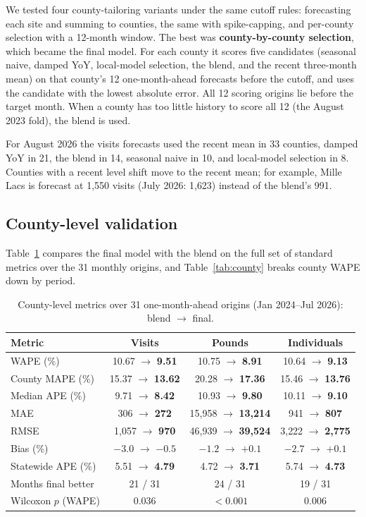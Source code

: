 \documentclass[11pt,letterpaper]{article}
\newcommand{\best}[1]{\textbf{#1}}
\begin{document}
We tested four county-tailoring variants under the same cutoff rules: forecasting each site and
summing to counties, the same with spike-capping, and per-county selection with a 12-month window. The
best was \textbf{county-by-county selection}, which became the final model. For each county it scores
five candidates (seasonal naive, damped YoY, local-model selection, the blend, and the recent
three-month mean) on that county's 12 one-month-ahead forecasts before the cutoff, and uses the
candidate with the lowest absolute error. All 12 scoring origins lie before the target month. When a
county has too little history to score all 12 (the August 2023 fold), the blend is used.

For August 2026 the visits forecasts used the recent mean in 33 counties, damped YoY in 21, the
blend in 14, seasonal naive in 10, and local-model selection in 8. Counties with a recent level
shift move to the recent mean; for example, Mille Lacs is forecast at 1{,}550 visits (July 2026:
1{,}623) instead of the blend's 991.

\subsection{County-level validation}
Table~\ref{tab:metrics} compares the final model with the blend on the full set of standard metrics
over the 31 monthly origins, and Table~\ref{tab:county} breaks county WAPE down by period.

\begin{table}[H]\centering\small
\caption{County-level metrics over 31 one-month-ahead origins (Jan 2024--Jul 2026): blend $\rightarrow$ final.}\label{tab:metrics}
\setlength{\tabcolsep}{4pt}
\begin{tabular}{lccc}
\toprule
Metric & Visits & Pounds & Individuals\\
\midrule
WAPE (\%) & 10.67 $\rightarrow$ \best{9.51} & 10.75 $\rightarrow$ \best{8.91} & 10.64 $\rightarrow$ \best{9.13}\\
County MAPE (\%) & 15.37 $\rightarrow$ \best{13.62} & 20.28 $\rightarrow$ \best{17.36} & 15.46 $\rightarrow$ \best{13.76}\\
Median APE (\%) & 9.71 $\rightarrow$ \best{8.42} & 10.93 $\rightarrow$ \best{9.80} & 10.11 $\rightarrow$ \best{9.10}\\
MAE & 306 $\rightarrow$ \best{272} & 15{,}958 $\rightarrow$ \best{13{,}214} & 941 $\rightarrow$ \best{807}\\
RMSE & 1{,}057 $\rightarrow$ \best{970} & 46{,}939 $\rightarrow$ \best{39{,}524} & 3{,}222 $\rightarrow$ \best{2{,}775}\\
Bias (\%) & $-3.0$ $\rightarrow$ \best{$-0.5$} & $-1.2$ $\rightarrow$ \best{$+0.1$} & $-2.7$ $\rightarrow$ \best{$+0.1$}\\
Statewide APE (\%) & 5.51 $\rightarrow$ \best{4.79} & 4.72 $\rightarrow$ \best{3.71} & 5.74 $\rightarrow$ \best{4.73}\\
\midrule
Months final better & 21 / 31 & 24 / 31 & 19 / 31\\
Wilcoxon $p$ (WAPE) & 0.036 & $<0.001$ & 0.006\\
\bottomrule
\end{tabular}
\end{table}
\end{document}

